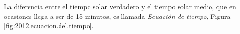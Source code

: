 \documentclass[a4paper,12pt,twoside]{article}
\begin{document}
La diferencia entre el tiempo solar verdadero y el tiempo solar medio, que en ocasiones llega a ser de 15 minutos, es llamada \emph{Ecuación de tiempo}, Figura \ref{fig:2012.ecuacion.del.tiempo}.


\begin{figure}[!h]
  \centering


\end{figure}
\end{document}
